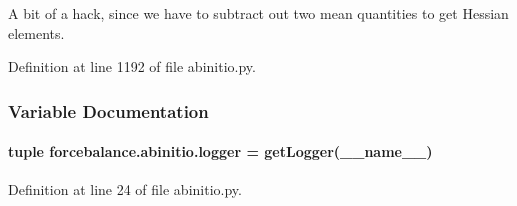 A bit of a hack, since we have to subtract out two mean quantities to get Hessian elements. 



Definition at line 1192 of file abinitio.\-py.



\subsubsection{Variable Documentation}
\hypertarget{namespaceforcebalance_1_1abinitio_a338e08128cae5bd4135a9ffb19f78f14}{
\paragraph[{logger}]{\setlength{\rightskip}{0pt plus 5cm}tuple forcebalance.\-abinitio.\-logger = get\-Logger(\-\_\-\-\_\-name\-\_\-\-\_\-)}}\label{namespaceforcebalance_1_1abinitio_a338e08128cae5bd4135a9ffb19f78f14}


Definition at line 24 of file abinitio.\-py.

